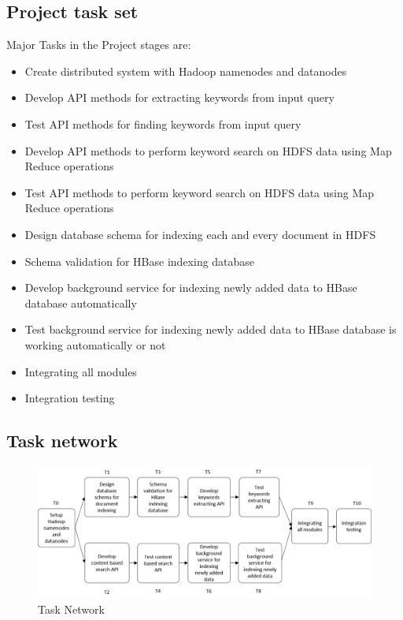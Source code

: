 \documentclass[oneside,a4paper,12pt]{report}
\begin{document}
\subsection{Project task set}
Major Tasks in the Project stages are: 
\begin{itemize}
\item Create distributed system with Hadoop namenodes and datanodes
\item Develop API methods for extracting keywords from input query
\item Test API methods for finding keywords from input query
\item Develop API methods to perform keyword search on HDFS data using Map Reduce operations
\item Test API methods to perform keyword search on HDFS data using Map Reduce operations
\item Design database schema for indexing each and every document in HDFS
\item Schema validation for HBase indexing database
\item Develop background service for indexing newly added data to HBase database automatically
\item Test background service for indexing newly added data to HBase database is working automatically or not
\item Integrating all modules
\item Integration testing
\end{itemize}

\subsection{Task network}
\begin{figure}[H]
\includegraphics{task_network}
\caption{Task Network}
\end{figure}
\end{document}
